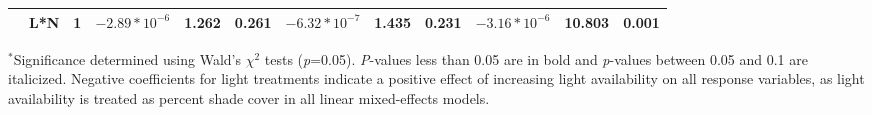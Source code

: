 \begin{landscape}
\begin{table}
{\begin{tabular}{p{0.1cm}p{2.5cm}p{0.5cm}p{1.75cm}p{1.5cm}p{1.5cm}p{1.75cm}p{1.5cm}p{1.5cm}p{1.75cm}p{1.5cm}p{1.5cm}}
         & L*N
         & \multicolumn{1}{r}{1}
         & \multicolumn{1}{r}{$-2.89*10^{-6}$}    & \multicolumn{1}{r}{1.262}     & \multicolumn{1}{r}{0.261}                
         & \multicolumn{1}{r}{$-6.32*10^{-7}$}    & \multicolumn{1}{r}{1.435}     & \multicolumn{1}{r}{0.231}                
         & \multicolumn{1}{r}{$-3.16*10^{-6}$}    & \multicolumn{1}{r}{10.803}    & \multicolumn{1}{r}{\textbf{0.001}} 
         \\ 
         \hline 
\end{tabular}}
\label{tab:table2.1}
\end{table}
\begin{singlespace}
    \noindent $^{*}$Significance determined using Wald’s $\chi^{2}$ tests (\textit{p}=0.05). \textit{P}-values less than 0.05 are in bold and \textit{p}-values between 0.05 and 0.1 are italicized. Negative coefficients for light treatments indicate a positive effect of increasing light availability on all response variables, as light availability is treated as percent shade cover in all linear mixed-effects models.
\end{singlespace}
\end{landscape}
\clearpage

